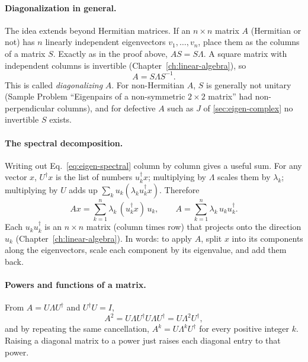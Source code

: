 \paragraph{Diagonalization in general.} The idea extends beyond Hermitian matrices. If an $n\times n$ matrix $A$ (Hermitian or not) has $n$ linearly independent eigenvectors $v_1,\dots,v_n$, place them as the columns of a matrix $S$. Exactly as in the proof above, $AS=S\Lambda$. A square matrix with independent columns is invertible (Chapter~\ref{ch:linear-algebra}), so
\begin{equation}
A=S\Lambda S^{-1}.
\label{eq:eigen-diag-general}
\end{equation}
This is called \emph{diagonalizing} $A$. For non-Hermitian $A$, $S$ is generally not unitary (Sample Problem ``Eigenpairs of a non-symmetric $2\times2$ matrix'' had non-perpendicular columns), and for defective $A$ such as $J$ of \cref{sec:eigen-complex} no invertible $S$ exists.

\paragraph{The spectral decomposition.} Writing out Eq.~\eqref{eq:eigen-spectral} column by column gives a useful sum. For any vector $x$, $U^\dagger x$ is the list of numbers $u_k^\dagger x$; multiplying by $\Lambda$ scales them by $\lambda_k$; multiplying by $U$ adds up $\sum_k u_k(\lambda_ku_k^\dagger x)$. Therefore
\begin{equation}
Ax=\sum_{k=1}^n\lambda_k\,(u_k^\dagger x)\,u_k,
\qquad
A=\sum_{k=1}^n\lambda_k\,u_ku_k^\dagger.
\label{eq:eigen-decomp}
\end{equation}
Each $u_ku_k^\dagger$ is an $n\times n$ matrix (column times row) that projects onto the direction $u_k$ (Chapter~\ref{ch:linear-algebra}). In words: to apply $A$, split $x$ into its components along the eigenvectors, scale each component by its eigenvalue, and add them back.

\paragraph{Powers and functions of a matrix.} From $A=U\Lambda U^\dagger$ and $U^\dagger U=I$,
\begin{equation}
A^2=U\Lambda U^\dagger U\Lambda U^\dagger=U\Lambda^2U^\dagger,
\end{equation}
and by repeating the same cancellation, $A^k=U\Lambda^kU^\dagger$ for every positive integer $k$. Raising a diagonal matrix to a power just raises each diagonal entry to that power.

